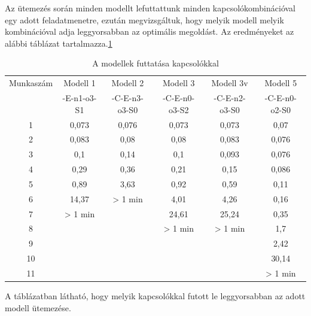 \documentclass [12pt]{report}
\begin{document}
  
   Az ütemezés során minden modellt lefuttattunk minden kapcsolókombinációval egy adott feladatmenetre, ezután megvizsgáltuk, hogy melyik modell melyik kombinációval adja leggyorsabban az optimális megoldást. Az eredményeket az alábbi táblázat tartalmazza.\ref{tab:kapcsolo}\\
   \begin{table}[htpb]
   \label{tab:kapcsolo}
              \centering
              \setlength{\tabcolsep}{1pt}
    	\begin{tabular}{c|c|c|c|c|c}
    	
    	Munkaszám & Modell 1 & Modell 2 & Modell 3 & Modell 3v & Modell 5 \\ 
    	
    	 & -E-n1-o3-S1 & -C-E-n3-o3-S0 & -C-E-n0-o3-S2 & -C-E-n2-o3-S0 & -C-E-n0-o2-S0 \\ 
    	\hline 
    	1 & 0,073 & 0,076 & 0,073 & 0,073 & 0,07 \\ 
     
    	2 & 0,083 & 0,08 & 0,08 & 0,083 & 0,076 \\ 
     
    	3 & 0,1 & 0,14 & 0,1 & 0,093 & 0,076 \\ 
    
    	4 & 0,29 & 0,36 & 0,21 & 0,15 & 0,086 \\ 
    
    	5 & 0,89 & 3,63 & 0,92 & 0,59 & 0,11 \\ 
    
    	6 & 14,37 & > 1 min & 4,01 & 4,26 & 0,16 \\ 
    
    	7 & > 1 min &  & 24,61 & 25,24 & 0,35 \\ 
    
    	8 &  &  & > 1 min & > 1 min & 1,7 \\ 
    
    	9 &  &  &  &  & 2,42 \\ 
    
    	10 &  &  &  &  & 30,14 \\ 
    	11 &  &  &  &  & > 1 min \\ 
    	\end{tabular} 
    	\caption{A modellek futtatása kapcsolókkal}
    	
   \end{table}
    A táblázatban látható, hogy melyik kapcsolókkal futott le leggyorsabban az adott modell ütemezése.\\\\
\end{document}
